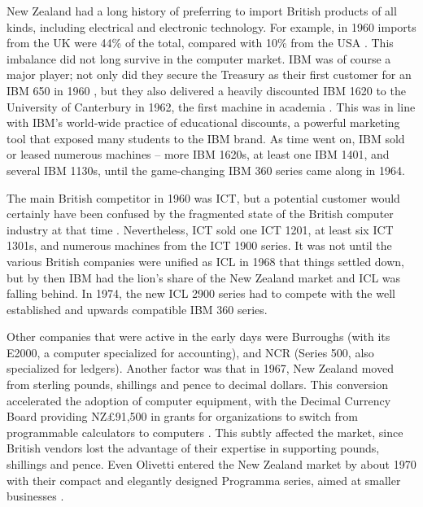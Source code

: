 \documentclass{IEEEcsmag}
\begin{document}
New Zealand had a long history of preferring to import British products of all kinds, including electrical and electronic technology.
\cbstart
For example, in 1960 imports from the UK were 44\% of the total, compared with 10\% from the USA \cite{Yearbook62}. This imbalance did not long survive in the computer market.
\cbend
IBM was of course a major player; not only did they secure the Treasury as their first customer for an IBM 650 in 1960 \cite{FirstCinNZ}, but they also delivered a heavily discounted IBM 1620 to the University of Canterbury in 1962, the first machine in academia \cite{Dale-Canty2}. This was in line with IBM’s world-wide practice of educational discounts, a powerful marketing tool that exposed many students to the IBM brand. As time went on, IBM sold or leased numerous machines -- more IBM 1620s, at least one IBM 1401, and several IBM 1130s, until the game-changing IBM 360 series came along in 1964.

The main British competitor in 1960 was ICT, but a potential customer would certainly have been confused by the fragmented state of the British computer industry at that time \cite{Hendry-1989}.
Nevertheless, ICT sold one ICT 1201, at least six ICT 1301s, and numerous machines from the ICT 1900 series.
It was not until the various British companies were unified as ICL in 1968 that things settled down, but by then IBM had the lion’s share of the New Zealand market and ICL was falling behind. In 1974, the new ICL 2900 series had to compete with the well established and upwards compatible IBM 360 series.

Other companies that were active in the early days were Burroughs (with its E2000, a computer specialized for accounting), and NCR (Series 500, also specialized for ledgers). Another factor was that in 1967, New Zealand moved from sterling pounds, shillings and pence to decimal dollars. This conversion accelerated the adoption of computer equipment, with the Decimal Currency Board providing NZ£91,500 in grants for organizations to switch from programmable calculators to computers \cite{Treasury-1966}. This subtly affected the market, since British vendors lost the advantage of their expertise in supporting pounds, shillings and pence. Even Olivetti entered the New Zealand market by about 1970 with their compact and elegantly designed Programma series, aimed at smaller businesses \cite{Taupo-Olivetti-1970}. 
\end{document}
